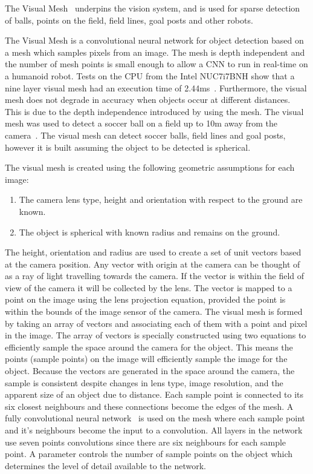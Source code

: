 \documentclass{llncs}
\begin{document}
\medskip

The Visual Mesh~\cite{Houliston2018VisualMR} underpins the vision system, and is used for sparse detection of balls, points on the field, field lines, goal posts and other robots.

The Visual Mesh is a convolutional neural network for object detection based on a mesh which samples pixels from an image. The mesh is depth independent and the number of mesh points is small enough to allow a CNN to run in real-time on a humanoid robot. Tests on the CPU from the Intel\textsuperscript{\textregistered} NUC7i7BNH show that a nine layer visual mesh had an execution time of 2.44ms~\cite{Houliston2018VisualMR}. Furthermore, the visual mesh does not degrade in accuracy when objects occur at different distances. This is due to the depth independence introduced by using the mesh. The visual mesh was used to detect a soccer ball on a field up to 10m away from the camera~\cite{Houliston2018VisualMR}. The visual mesh can detect soccer balls, field lines and goal posts, however it is built assuming the object to be detected is spherical.

The visual mesh is created using the following geometric assumptions for each image:
\begin{enumerate}
    \item The camera lens type, height and orientation with respect to the ground are known. 
    \item The object is spherical with known radius and remains on the ground.
\end{enumerate}
The height, orientation and radius are used to create a set of unit vectors based at the camera position. Any vector with origin at the camera can be thought of as a ray of light travelling towards the camera. If the vector is within the field of view of the camera it will be collected by the lens. The vector is mapped to a point on the image using the lens projection equation, provided the point is within the bounds of the image sensor of the camera. The visual mesh is formed by taking an array of vectors and associating each of them with a point and pixel in the image. The array of vectors is specially constructed using two equations to efficiently sample the space around the camera for the object. This means the points (sample points) on the image will efficiently sample the image for the object. Because the vectors are generated in the space around the camera, the sample is consistent despite changes in lens type, image resolution, and the apparent size of an object due to distance. Each sample point is connected to its six closest neighbours and these connections become the edges of the mesh. A fully convolutional neural network~\cite{ShelmarLong2017} is used on the mesh where each sample point and it's neighbours become the input to a convolution. All layers in the network use seven points convolutions since there are six neighbours for each sample point. A parameter controls the number of sample points on the object which determines the level of detail available to the network. 
\end{document}

